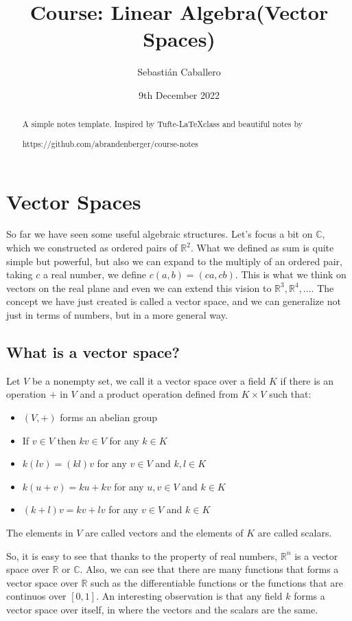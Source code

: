 \documentclass{tufte-handout}
\title{Course: Linear Algebra(Vector Spaces)}
\author{Sebastián Caballero}
\date{9th December 2022}
\begin{document}
\maketitle

\begin{abstract}
\noindent
A simple notes template. Inspired by Tufte-\LaTeX class and beautiful notes by \begin{verbatim*}
	https://github.com/abrandenberger/course-notes
\end{verbatim*}
\end{abstract}
\section{Vector Spaces}
So far we have seen some useful algebraic structures. Let's focus a bit on $\mathbb{C}$, which we constructed as ordered pairs of $\mathbb{R}^2$. What we defined as sum is quite simple but powerful, but also we can expand to the multiply of an ordered pair, taking $c$ a real number, we define $c(a, b) = (ca, cb)$. This is what we think on vectors on the real plane and even we can extend this vision to $\mathbb{R}^3, \mathbb{R}^4, \dots$. The concept we have just created is called a vector space, and we can generalize not just in terms of numbers, but in a more general way.

\subsection{What is a vector space?}
\begin{definition}
	Let $V$ be a nonempty set, we call it a vector space over a field $K$ if there is an operation $+$ in $V$ and a product operation defined from $K \times V$ such that:
	\begin{itemize}
		\item $(V, +)$ forms an abelian group
		\item If $v \in V$ then $kv \in V$ for any $k \in K$
		\item $k(lv) = (kl)v$ for any $v \in V$ and $k, l \in K$
		\item $k(u + v) = ku + kv$ for any $u, v \in V$ and $k \in K$
		\item $(k + l)v = kv + lv$ for any $v \in V$ and $k \in K$
	\end{itemize}
	The elements in $V$ are called vectors and the elements of $K$ are called scalars.
\end{definition}

So, it is easy to see that thanks to the property of real numbers, $\mathbb{R}^n$ is a vector space over $\mathbb{R}$ or $\mathbb{C}$. Also, we can see that there are many functions that forms a vector space over $\mathbb{R}$ such as the differentiable functions or the functions that are continuos over $[0, 1]$. An interesting observation is that any field $k$ forms a vector space over itself, in where the vectors and the scalars are the same. \\
\end{document}

